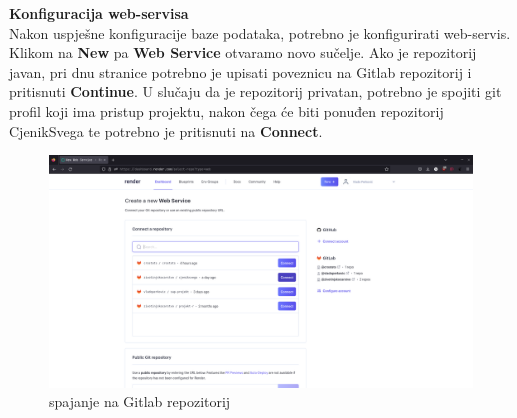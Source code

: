 			
			\textbf{Konfiguracija web-servisa}\\
			
			
			Nakon uspješne konfiguracije baze podataka, potrebno je konfigurirati web-servis. Klikom na \textbf{New} pa \textbf{Web Service} otvaramo novo sučelje. Ako je repozitorij javan, pri dnu stranice potrebno je upisati poveznicu na Gitlab repozitorij i pritisnuti \textbf{Continue}. U slučaju da je repozitorij privatan, potrebno je spojiti git profil koji ima pristup projektu, nakon čega će biti ponuđen repozitorij CjenikSvega te potrebno je pritisnuti na \textbf{Connect}.
			\begin{figure}[H]
			\includegraphics[width=\textwidth]{slike/connectweb.png} %
			\caption{spajanje na Gitlab repozitorij}
			\label{fig:gitlabConnect} %
			\end{figure}
			

